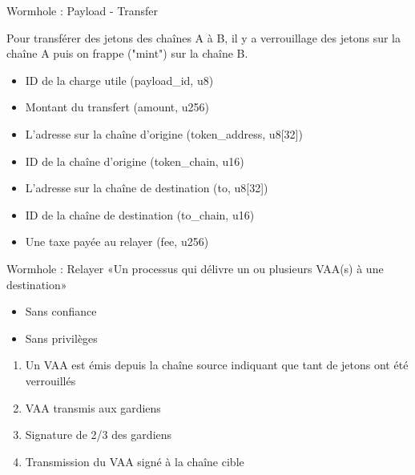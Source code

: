 \begin{frame}{Wormhole : Payload - Transfer}

Pour transférer des jetons des chaînes A à B, il y a verrouillage des jetons sur la chaîne A puis on frappe ("mint") sur la chaîne B.\newline

\begin{itemize}
    \item ID de la charge utile (payload\_id, u8)
    \item Montant du transfert (amount, u256)
    \item L'adresse sur la chaîne d'origine (token\_address, u8[32])
    \item ID de la chaîne d'origine (token\_chain, u16)
    \item L'adresse sur la chaîne de destination (to, u8[32])
    \item ID de la chaîne de destination (to\_chain, u16)
    \item Une taxe payée au relayer (fee, u256)
\end{itemize} 
\end{frame}

\begin{frame}{Wormhole : Relayer}
 «Un processus qui délivre un ou plusieurs VAA(s) à une destination»

 \begin{itemize}
    \item Sans confiance
    \item Sans privilèges
\end{itemize}

\begin{enumerate}
    \item Un VAA est émis depuis la chaîne source indiquant que tant de jetons ont été verrouillés
    \item VAA transmis aux gardiens
    \item Signature de 2/3 des gardiens
    \item Transmission du VAA signé à la chaîne cible
\end{enumerate}
\end{frame}